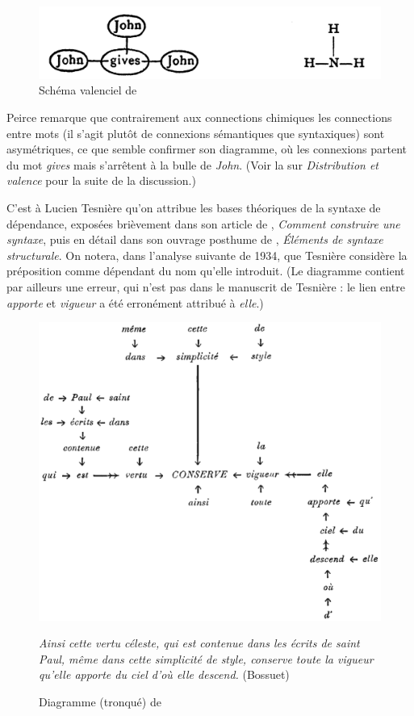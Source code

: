 {    \begin{figure}[H]
    \caption{Schéma valenciel de \citet{peirce1897logic}}
    \includegraphics[width=\textwidth]{figures/vol1syntaxe2-img016.png}
    \end{figure}

    Peirce remarque que contrairement aux connections chimiques les connections entre mots (il s’agit plutôt de connexions sémantiques que syntaxiques) sont asymétriques, ce que semble confirmer son diagramme, où les connexions partent du mot \textit{gives} mais s’arrêtent à la bulle de \textit{John}. (Voir la  sur \textit{Distribution et valence} pour la suite de la discussion.)

    C’est à Lucien Tesnière qu’on attribue les bases théoriques de la syntaxe de dépendance, exposées brièvement dans son article de \citeyear{tesniere1934comment}, \textit{Comment construire une syntaxe}, puis en détail dans son ouvrage posthume de \citeyear{tesniere1959elements}, \textit{Éléments de syntaxe structurale}. On notera, dans l’analyse suivante de 1934, que Tesnière considère la préposition comme dépendant du nom qu’elle introduit. (Le diagramme contient par ailleurs une erreur, qui n’est pas dans le manuscrit de Tesnière : le lien entre \textit{apporte} et \textit{vigueur} a été erronément attribué à \textit{elle}.)

    \begin{figure}[H]
    \caption{Diagramme (tronqué) de \citet{tesniere1934comment}}
    \includegraphics[width=\textwidth]{figures/Tesniere1934.png}\smallskip\\    
    \noindent\parbox{\textwidth}{\small\textit{Ainsi cette vertu céleste, qui est contenue dans les écrits de saint Paul, même dans cette simplicité de style, conserve toute la vigueur qu’elle apporte du ciel d’où elle descend.} (Bossuet)}
    \end{figure}

}
